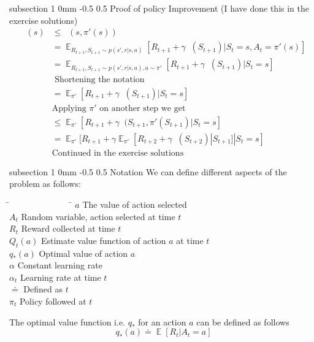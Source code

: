 \documentclass[twocolumn,11pt]{article}
\makeatletter
\DeclareMathOperator{\E}{\mathbb{E}}
\DeclareMathOperator{\qp}{q_\pi} %
\DeclareMathOperator{\vp}{v_\pi} %
\renewcommand{\subsection}{\@startsection
{subsection}%
{1}%
{0mm}%
{-0.5\baselineskip}%
{0.5\baselineskip}%
{\bfseries\color{blue}}} %
\makeatother
\begin{document}
\subsection{Proof of policy Improvement (I have done this in the exercise solutions)}
\begin{align*}
	\vp(s) & \leq \qp(s,\pi'(s))\\
	&= \E_{R_{t+1},S_{t+1} \sim p(s',r|s,a) }[ R_{t+1}+ \gamma \vp(S_{t+1}) | S_t = s, A_t = \pi'(s)]\\
	&= \E_{R_{t+1},S_{t+1} \sim p(s',r|s,a) ,a \sim \pi'}[ R_{t+1}+ \gamma \vp(S_{t+1}) | S_t = s]\\
	& \text{ Shortening the notation}\\
	&= \E_{\pi'}[ R_{t+1}+ \gamma \vp(S_{t+1}) | S_t = s]\\
	& \text{Applying $\pi'$ on another step we get}\\
	& \leq  \E_{\pi'}[ R_{t+1} + \gamma \qp(S_{t+1}, \pi'(S_{t+1}) | S_t = s]\\
	& = \E_{\pi'}[ R_{t+1} + \gamma  \E_{\pi'}[R_{t+2} + \gamma \vp(S_{t+2}) | S_{t+1}]    | S_t = s]\\
	&\text{Continued in the exercise solutions}
\end{align*}



\subsection{Notation}
We can define different aspects of the problem as follows:
\noindent
\begin{tabbing}
\=~~~~~~~~~~~~~~  \= \kill
\>$a$   \>The value of action selected \\
\>$A_t$    \>Random variable, action selected at time $t$\\
\>$R_t $    \>Reward collected at time $t$\\
\>$Q_t(a)$    \>Estimate value function of action $a$ at time $t$\\
\>$q_*(a)$    \>Optimal value of action $a$\\
\>$\alpha$    \>Constant learning rate\\
\>$\alpha_t$    \> Learning rate at time $t$\\
\>$\doteq$    \>Defined as $t$\\
\>$\pi_t$    \>Policy followed at $t$\\
\end{tabbing}
The optimal value function i.e. $q_*$ for an action $a$ can be defined as follows\useshortskip
\begin{equation}
    q_*(a) \doteq \E[R_t| A_t = a]
\end{equation}
\end{document}
